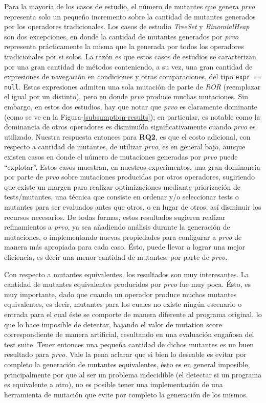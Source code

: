 Para la mayor\'ia de los casos de estudio, el n\'umero de mutantes que genera \emph{prvo} representa solo un peque\~no incremento sobre la cantidad de mutantes generados por los operadores tradicionales. Los casos de estudio \emph{TreeSet} y \emph{BinomialHeap} son dos excepciones, en donde la cantidad de mutantes generados por \emph{prvo} representa pr\'acticamente la misma que la generada por todos los operadores tradicionales por si solos. La raz\'on es que estos casos de estudios se caracterizan por una gran cantidad de m\'etodos conteniendo, a su vez, una gran cantidad de expresiones de navegaci\'on en condiciones y otras comparaciones, del tipo \texttt{expr == null}. Estas expresiones admiten una sola mutaci\'on de parte de \emph{ROR} (reemplazar el igual por un distinto), pero en donde \emph{prvo} produce muchas mutaciones. Sin embargo, en estos dos estudios, hay que notar que \emph{prvo} es claramente dominante (como se ve en la Figura-\ref{subsumption-results}); en particular, es notable como la dominancia de otros operadores es disminu\'ida significativamente cuando \emph{prvo} es utilizado. Nuestra respuesta entonces para \textbf{RQ2}, es que el costo adicional, con respecto a cantidad de mutantes, de utilizar \emph{prvo}, es en general bajo, aunque existen casos en donde el n\'umero de mutaciones generadas por \emph{prvo} puede ``explotar''. Estos casos muestran, en nuestros experimentos, una gran dominancia por parte de \emph{prvo} sobre mutaciones producidas por otros operadores, sugiriendo que existe un margen para realizar optimizaciones mediante priorizaci\'on de tests/mutantes, una t\'ecnica que consiste en ordenar y/o seleccionar tests o mutantes para ser evaluados antes que otros, o en lugar de otros, as\'i disminuir los recursos necesarios. De todas formas, estos resultados sugieren realizar refinamientos a \emph{prvo}, ya sea a\~nadiendo an\'alisis durante la generaci\'on de mutaciones, o implementando nuevas propiedades para configurar a \emph{prvo} de manera m\'as apropiada para cada caso. \'Esto, puede llevar a lograr una mejor eficiencia, es decir una menor cantidad de mutantes, por parte de \emph{prvo}.

Con respecto a mutantes equivalentes, los resultados son muy interesantes. La cantidad de mutantes equivalentes producidos por \emph{prvo} fue muy poca. \'Esto, es muy importante, dado que cuando un operador produce muchos mutantes equivalentes, es decir, mutantes para los cuales no existe ning\'un escenario o entrada para el cual \'este se comporte de manera diferente al programa original, lo que lo hace imposible de detectar, bajando el valor de mutation score correspondiente de manera artificial, resultando en una evaluaci\'on enga\~nosa del test suite. Tener entonces una peque\~na cantidad de dichos mutantes es un buen resultado para \emph{prvo}. Vale la pena aclarar que si bien lo deseable es evitar por completo la generaci\'on de mutantes equivalentes, \'esto es en general imposible, principalmente por que al ser un problema indecidible (el detectar si un programa es equivalente a otro), no es posible tener una implementaci\'on de una herramienta de mutaci\'on que evite por completo la generaci\'on de los mismos.

